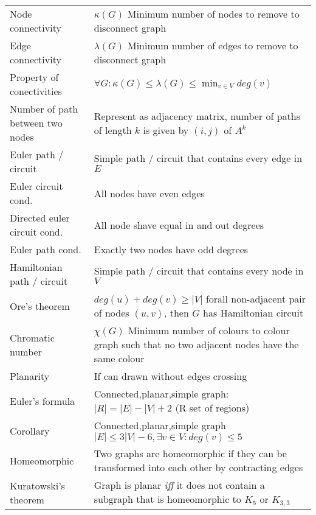 \documentclass[a4paper,landscape]{article}
\begin{document}
\begin{multicols*}{2}
\begin{tabularx}{\columnwidth}{@{}lX@{}}
        Node connectivity                & $\kappa(G)$ Minimum number of nodes to remove to disconnect graph                                        \\
        Edge connectivity                & $\lambda(G)$ Minimum number of edges to remove to disconnect graph                                       \\
        Property of conectivities        & $\forall G : \kappa(G) \leq \lambda(G) \leq \min_{v \in V} deg(v)$                                       \\
        Number of path between two nodes & Represent as adjacency matrix, number of paths of length $k$ is given by $(i,j)$ of $A^k$                \\
        Euler path / circuit             & Simple path / circuit that contains every edge in $E$                                                    \\
        Euler circuit cond.              & All nodes have even edges                                                                                \\
        Directed euler circuit cond.     & All node shave equal in and out degrees                                                                  \\
        Euler path cond.                 & Exactly two nodes have odd degrees                                                                       \\
        Hamiltonian path / circuit       & Simple path / circuit that contains every node in $V$                                                    \\
        Ore's theorem                    & $deg(u) + deg(v) \geq |V|$ forall non-adjacent pair of nodes $(u,v)$, then $G$ has Hamiltonian circuit   \\
        Chromatic number                 & $\chi(G)$ Minimum number of colours to colour graph such that no two adjacent nodes have the same colour \\
        Planarity                        & If can drawn without edges crossing                                                                      \\
        Euler's formula                  & Connected,planar,simple graph: $|R|=|E|-|V|+2$ (R set of regions)                                        \\
        Corollary                        & Connected,planar,simple graph $|E| \leq 3|V| - 6, \exists v \in V : deg(v) \leq 5$                       \\
        Homeomorphic                     & Two graphs are homeomorphic if they can be transformed into each other by contracting edges              \\
        Kuratowski's theorem             & Graph is planar \textit{iff} it does not contain a subgraph that is homeomorphic to $K_5$ or $K_{3,3}$   \\
    \end{tabularx}
\end{multicols*}
\end{document}
